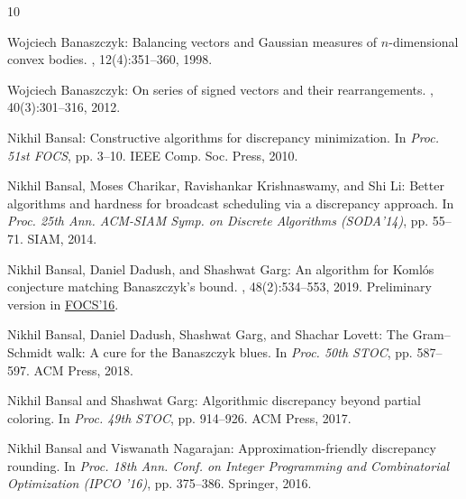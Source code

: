 \documentclass[11pt]{article}
\numberwithin{equation}{section}
\theoremstyle{definition}
\theoremstyle{plain}
\begin{document}
\tocrefpdfbookmark
\begin{thebibliography}{10}

{\sc Wojciech Banaszczyk}: Balancing vectors and {G}aussian measures of
  $n$-dimensional convex bodies.
, 12(4):351--360, 1998.

{\sc Wojciech Banaszczyk}: On series of signed vectors and their
  rearrangements.
, 40(3):301--316, 2012.

{\sc Nikhil Bansal}: Constructive algorithms for discrepancy minimization.
\newblock In {\em Proc. 51st FOCS}, pp. 3--10. IEEE Comp. Soc. Press, 2010.

{\sc Nikhil Bansal, Moses Charikar, Ravishankar Krishnaswamy, and Shi Li}:
  Better algorithms and hardness for broadcast scheduling via a discrepancy
  approach.
\newblock In {\em Proc. 25th Ann. ACM-SIAM Symp. on Discrete Algorithms
  (SODA'14)}, pp. 55--71. SIAM, 2014.
\newblock [\epfmtdoi{10.1137/1.9781611973402.5}]

{\sc Nikhil Bansal, Daniel Dadush, and Shashwat Garg}: An algorithm for
  {K}oml\'os conjecture matching {B}anaszczyk's bound.
, 48(2):534--553, 2019.
\newblock Preliminary version in
  \href{https://doi.org/10.1109/FOCS.2016.89}{FOCS'16}.

{\sc Nikhil Bansal, Daniel Dadush, Shashwat Garg, and Shachar Lovett}: The
  {G}ram--{S}chmidt walk: {A} cure for the {B}anaszczyk blues.
\newblock In {\em Proc. 50th STOC}, pp. 587--597. ACM Press, 2018.
\newblock [\epfmtdoi{10.1145/3188745.3188850}]

{\sc Nikhil Bansal and Shashwat Garg}: Algorithmic discrepancy beyond partial
  coloring.
\newblock In {\em Proc. 49th STOC}, pp. 914--926. ACM Press, 2017.

{\sc Nikhil Bansal and Viswanath Nagarajan}: Approximation-friendly discrepancy
  rounding.
\newblock In {\em Proc. 18th Ann. Conf. on Integer Programming and
  Combinatorial Optimization (IPCO '16)}, pp. 375--386. Springer, 2016.


\end{thebibliography}
\end{document}
